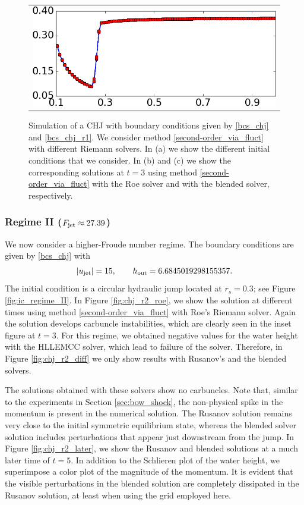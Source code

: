 \documentclass[preprint, 11pt]{article}
\newcommand{\out}{\textup{out}}
\newcommand{\jet}{{\textup{jet}}}
\newcommand{\bfu}{{u}}
\begin{document}
{\begin{figure}
{\begin{tabular}{c}
      \includegraphics[scale=0.27,valign=c]{figures/chj_slices_delta1p0_blended.png} 
    \end{tabular}
  }    
    \caption{Simulation of a CHJ with boundary conditions given by \eqref{bcs_chj} and \eqref{bcs_chj_r1}.    
      We consider method \eqref{second-order_via_fluct} with different Riemann solvers.
      In (a) we show the different initial conditions that we consider.
      In (b) and (c) we show the corresponding solutions at $t=3$ using method
      \eqref{second-order_via_fluct} with the Roe solver and with the blended solver, respectively. 
      \label{fig:stab_shock}}
  \end{figure}
}

\subsubsection{Regime II ($F_\jet\approx27.39$)}\label{sec:regime_ii}
We now consider a higher-Froude number regime. The boundary conditions are
given by \eqref{bcs_chj} with 
\begin{align}\label{bcs_chj_r2}
  |\bfu_\jet|=15, \qquad h_\out=6.6845019298155357.
\end{align}
The initial condition is a circular hydraulic jump located at $r_s=0.3$; see Figure \ref{fig:ic_regime_II}.
In Figure \ref{fig:chj_r2_roe}, we show the solution at different times using method
\eqref{second-order_via_fluct} with Roe's Riemann solver. Again the solution develops
carbuncle instabilities, which are clearly seen in the inset figure at $t=3$.
For this regime, we obtained negative values for the water height with
the HLLEMCC solver, which lead to failure of the solver. Therefore, in Figure
\ref{fig:chj_r2_diff} we only show results with Rusanov's and the blended
solvers.  

The solutions obtained with these solvers show no carbuncles.
{\color{OliveGreen} Note that, similar to the experiments in Section \ref{sec:bow_shock},
  the non-physical spike in the momentum is present in the numerical solution.}
The Rusanov solution remains very close to the initial symmetric equilibrium state,
whereas the blended solver solution includes perturbations that appear
just downstream from the jump.
In Figure \ref{fig:chj_r2_later}, we show the Rusanov and blended solutions at
a much later time of $t=5$.  In addition to the Schlieren plot of the water
height, we superimpose a color plot of the magnitude of the momentum. 
It is evident that the visible perturbations in the blended solution are
completely dissipated in the Rusanov solution, at least when using the grid employed here.
\end{document}
